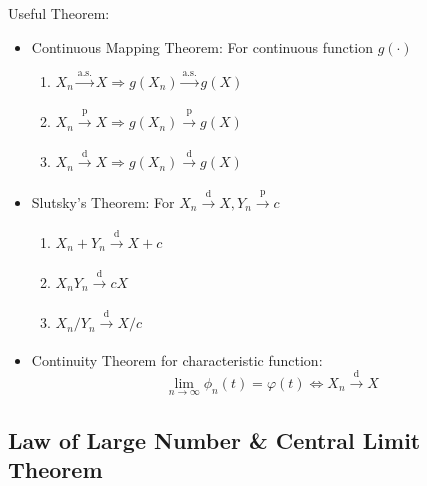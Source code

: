         Useful Theorem:
        \begin{itemize}[topsep=2pt,itemsep=0pt]
            \item Continuous Mapping Theorem: For continuous function $g(\cdot)$\hypertarget{ContinuousMapping}{}
            \begin{enumerate}[topsep=2pt,itemsep=2pt]
                \item $X_n\xrightarrow[]{\text{a.s.}}X\Rightarrow g(X_n)\xrightarrow[]{\text{a.s.}}g(X)$
                \item $X_n\xrightarrow[]{\mathrm{p}}X\Rightarrow g(X_n)\xrightarrow[]{\mathrm{p} }g(X)$
                \item $X_n\xrightarrow[]{\mathrm{d}}X\Rightarrow g(X_n)\xrightarrow[]{\mathrm{d}}g(X)$
            \end{enumerate}
            \item Slutsky's Theorem: For $X_n\xrightarrow[]{\mathrm{d}}X,Y_n\xrightarrow[]{\mathrm{p}}c$
                \begin{enumerate}[topsep=2pt,itemsep=2pt]   
                \item $X_n+Y_n\xrightarrow[]{\mathrm{d}}X+c$
                \item $X_nY_n\xrightarrow[]{\mathrm{d}}cX$
                \item $X_n/Y_n\xrightarrow[]{\mathrm{d}}X/c$
            \end{enumerate}
            \item Continuity Theorem for characteristic function:
            \begin{equation}        \lim_{n\to\infty}\phi_n(t)=\varphi(t)\Leftrightarrow X_n\xrightarrow[]{\mathrm{d}}X\end{equation}
        \end{itemize} 


\subsection{Law of Large Number \& Central Limit Theorem}

